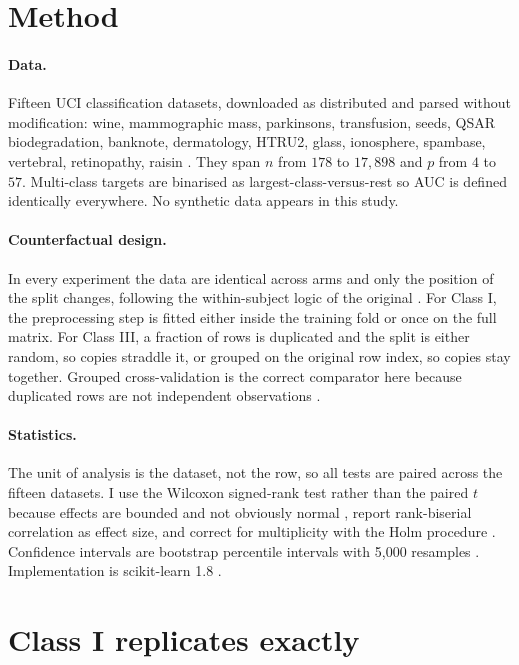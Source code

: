 \documentclass[10pt,twocolumn]{article}
\begin{document}
\section{Method}

\paragraph{Data.} Fifteen UCI classification datasets, downloaded as distributed
and parsed without modification: wine, mammographic mass, parkinsons,
transfusion, seeds, QSAR biodegradation, banknote, dermatology, HTRU2,
glass, ionosphere, spambase, vertebral, retinopathy, raisin
\cite{ucirepo,dua2019}. They span $n$ from $178$ to $17{,}898$ and $p$ from $4$
to $57$. Multi-class targets are binarised as largest-class-versus-rest so AUC is
defined identically everywhere. No synthetic data appears in this study.

\paragraph{Counterfactual design.} In every experiment the data are identical
across arms and only the position of the split changes, following the
within-subject logic of the original \cite{roth2026}. For Class I, the
preprocessing step is fitted either inside the training fold or once on the full
matrix. For Class III, a fraction of rows is duplicated and the split is either
random, so copies straddle it, or grouped on the original row index, so copies
stay together. Grouped cross-validation is the correct comparator here because
duplicated rows are not independent observations
\cite{roberts2017,varoquaux2017}.

\paragraph{Statistics.} The unit of analysis is the dataset, not the row, so all
tests are paired across the fifteen datasets. I use the Wilcoxon signed-rank test
rather than the paired $t$ because effects are bounded and not obviously normal
\cite{demsar2006}, report rank-biserial correlation as effect size, and correct
for multiplicity with the Holm procedure \cite{holm1979}. Confidence intervals
are bootstrap percentile intervals with 5{,}000 resamples \cite{efron1993}.
Implementation is scikit-learn 1.8 \cite{pedregosa2011,buitinck2013}.

\section{Class I replicates exactly}
\label{sec:class1}
\end{document}
